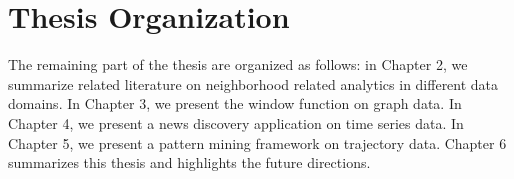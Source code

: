 \section{Thesis Organization}
The remaining part of the thesis are organized as follows: in Chapter 2, we summarize related literature on neighborhood related analytics in different data domains. In Chapter 3, we present the window function on graph data. In Chapter 4, we present a news discovery application on time series data.
In Chapter 5, we present a pattern mining framework on trajectory data. Chapter 6 summarizes this thesis and highlights the future directions.